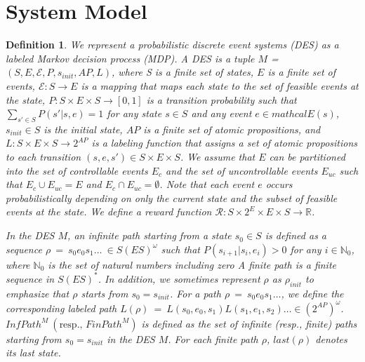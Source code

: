 \documentclass[letterpaper, 10 pt, conference]{ieeeconf}
\newtheorem{definition}{Definition}
\begin{document}
\section{System Model}

\begin{definition}
We represent a probabilistic discrete event systems (DES) as a labeled Markov decision process (MDP). A DES is a tuple $M$ = $(S, E, \mathcal{E}, P, s_{init}, AP, L)$, where S is a finite set of states, $E$ is a finite set of events, $\mathcal{E} : S \rightarrow E$ is a mapping that maps each state to the set of feasible events at the state, $P:S \times E \times S \rightarrow [0,1]$ is a transition probability such that $\sum_{s' \in S} P(s'|s,e) = 1$ for any state $s \in S$ and any event $e \in mathcal{E}(s) $, $s_{init} \in S$ is the initial state, $AP$ is a finite set of atomic propositions, and $L : S \times E \times S \rightarrow 2^{AP}$ is a labeling function that assigns a set of atomic propositions to each transition $(s, e, s') \in S \times E \times S$. We assume that $E$ can be partitioned into the set of controllable events $E_c$ and the set of uncontrollable events $E_{uc}$ such that $E_c \cup E_{uc} = E$ and $E_c \cap E_{uc} = \emptyset$. Note that each event $e$ occurs probabilistically depending on only the current state and the subset of feasible events at the state. We define a reward function $\mathcal{R} : S \times 2^E \times E \times S \rightarrow \mathbb{R}$.

In the DES $M$, an infinite path starting from a state $s_0 \in S$ is defined as a sequence $\rho\ =\ s_0e_0s_1 \ldots\ \in S (E S)^{\omega}$ such that $P(s_{i+1}|s_i, e_i) > 0$ for any $ i \in \mathbb{N}_0$, where $\mathbb{N}_0$ is the set of natural numbers including zero A finite path is a finite sequence in $S (E S)^*$. In addition, we sometimes represent $\rho$ as $\rho_{init}$ to emphasize that $\rho$ starts from $s_0 = s_{init}$.
For a path $\rho\ =\ s_0e_0s_1 \ldots$, we define the corresponding labeled path $L(\rho)\ =\ L(s_0,e_0,s_1)L(s_1,e_1,s_2) \ldots \in (2^{AP})^{\omega}$.
 $InfPath^{M}\ ( \text{resp., }FinPath^{M})$ is defined as the set of infinite (resp., finite) paths starting from $s_0=s_{init}$ in the DES $M$. For each finite path $\rho$, $last(\rho)$ denotes its last state.
\end{definition}
\end{document}
